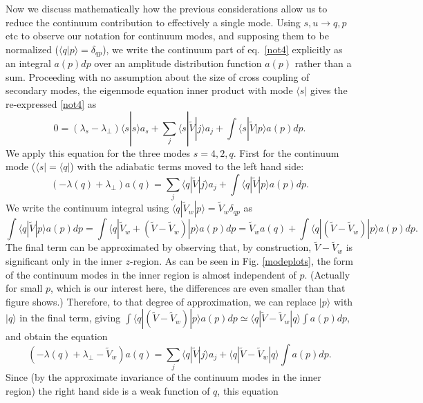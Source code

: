 \documentclass{jpp}
\def\ket#1{|#1\rangle}
\def\bra#1{\langle#1}
\begin{document}
Now we discuss mathematically how the previous considerations allow us
to reduce the continuum contribution to effectively a single mode.
Using $s,u\to q,p$ etc to observe our notation for continuum modes,
and supposing them to be normalized ($\bra{q}\ket{p}=\delta_{qp}$), we
write the continuum part of eq.\ \ref{not4} explicitly as an integral
$a(p)dp$ over an amplitude distribution function $a(p)$ rather than a
sum.  Proceeding with no assumption about the size of cross coupling
of secondary modes, the eigenmode equation inner product with mode
$\bra{s}|$ gives the re-expressed \ref{not4} as
\begin{equation}
  \label{eigengen}
  0=(\lambda_s-\lambda_\perp)\bra{s}\ket{s}a_s+\sum_j\bra{s}|\tilde{V}\ket{j}a_j
+\int\bra{s}|\tilde{V}\ket{p}a(p)dp.
\end{equation}
We apply this equation for the three modes $s=4,2,q$. First for the
continuum mode ($\bra{s}|=\bra{q}|$) with the adiabatic terms moved to
the left hand side:
\begin{equation}
  \label{eigqfirst}
  (-\lambda(q)+\lambda_\perp)a(q)=\sum_j\bra{q}|\tilde{V}\ket{j}a_j
+\int\bra{q}|\tilde V\ket{p} a(p)dp.
\end{equation}
We write the continuum integral using $\bra{q}|\tilde V_w\ket{p}=
\tilde V_w \delta_{qp}$ as 
\begin{equation}
  \label{contintegral}
  \int \bra{q}|\tilde{V}\ket{p}a(p)dp=\int\bra{q}|\tilde{V}_{w}+(\tilde{V}-\tilde{V}_{w})\ket{p}a(p)dp
  =\tilde{V}_{w}a(q) +\int\bra{q}|(\tilde{V}-\tilde{V}_{w})\ket{p}a(p)dp.
\end{equation}
The final term can be approximated by observing that, by construction,
$\tilde V -\tilde V_w$ is significant only in the inner $z$-region.
As can be seen in Fig. \ref{modeplots}, the form of the continuum
modes in the inner region is almost independent of $p$. (Actually for
small $p$, which is our interest here, the differences are even
smaller than that figure shows.) Therefore, to that degree of
approximation, we can replace $\ket{p}$ with $\ket{q}$ in the final
term, giving $\int\bra{q}|(\tilde{V}-\tilde{V}_{w})\ket{p}a(p)dp\simeq
\bra{q}|\tilde{V}-\tilde{V}_{w}\ket{q}\int a(p)dp$, and obtain the
equation
\begin{equation}
  \label{eigq}
  (-\lambda(q)+\lambda_\perp-\tilde V_w)a(q)=\sum_j\bra{q}|\tilde{V}\ket{j}a_j
+\bra{q}|\tilde V-\tilde V_w\ket{q}\int a(p)dp.
\end{equation}
Since (by the approximate invariance of the continuum modes in the
inner region) the right hand side is a weak function of $q$, this equation
\end{document}
